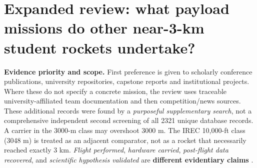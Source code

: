 \documentclass[10pt,a4paper]{article}
\begin{document}
\section{Expanded review: what payload missions do other near-3-km student rockets undertake?}
\label{sec:payloadreview}
\textbf{Evidence priority and scope.} First preference is given to scholarly conference publications, university repositories, capstone reports and institutional projects. Where these do not specify a concrete mission, the review uses traceable university-affiliated team documentation and then competition/news sources. These additional records were found by a \emph{purposeful supplementary search}, not a comprehensive independent second screening of all 2321 unique database records. A carrier in the 3000-m class may overshoot 3000 m. The IREC 10,000-ft class (3048 m) is treated as an adjacent comparator, not as a rocket that necessarily reached exactly 3 km. \emph{Flight performed}, \emph{hardware carried}, \emph{post-flight data recovered}, and \emph{scientific hypothesis validated} are \textbf{different evidentiary claims} \cite{euroc2024rules,rtc2027rules,moon2023harang}.
\end{document}
